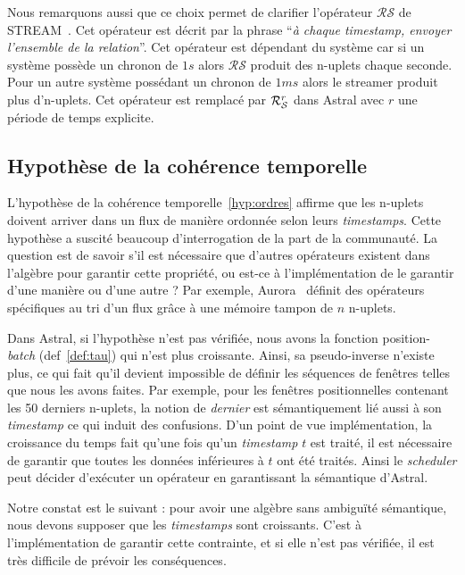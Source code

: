 Nous remarquons aussi que ce choix permet de clarifier l'opérateur $\mathcal{RS}$ de STREAM~\cite{Arasu:stream}. Cet opérateur est décrit par la phrase \enquote{\it à chaque timestamp, envoyer l'ensemble de la relation}. Cet opérateur est dépendant du système car si un système possède un chronon de $1s$ alors $\mathcal{RS}$ produit des n-uplets chaque seconde. Pour un autre système possédant un chronon de $1ms$ alors le streamer produit plus d'n-uplets. Cet opérateur est remplacé par $\mathcal{R}_{\mathcal S}^{r}$ dans Astral avec $r$ une période de temps explicite.

\subsection{Hypothèse de la cohérence temporelle}\label{sec:valid:expressivite:modele:coherence}
L'hypothèse de la cohérence temporelle~\ref{hyp:ordres} affirme que les n-uplets doivent arriver dans un flux de manière ordonnée selon leurs \textit{timestamps}. Cette hypothèse a suscité beaucoup d'interrogation de la part de la communauté. La question est de savoir s'il est nécessaire que d'autres opérateurs existent dans l'algèbre pour garantir cette propriété, ou est-ce à l'implémentation de le garantir d'une manière ou d'une autre ? Par exemple, Aurora~\cite{Abadi:aurora} définit des opérateurs spécifiques au tri d'un flux grâce à une mémoire tampon de $n$ n-uplets.

Dans Astral, si l'hypothèse n'est pas vérifiée, nous avons la fonction position-\textit{batch} (def~\ref{def:tau}) qui n'est plus croissante. Ainsi, sa pseudo-inverse n'existe plus, ce qui fait qu'il devient impossible de définir les séquences de fenêtres telles que nous les avons faites. Par exemple, pour les fenêtres positionnelles contenant les 50 derniers n-uplets, la notion de \textit{dernier} est sémantiquement lié aussi à son \textit{timestamp} ce qui induit des confusions. D'un point de vue implémentation, la croissance du temps fait qu'une fois qu'un \textit{timestamp} $t$ est traité, il est nécessaire de garantir que toutes les données inférieures à $t$ ont été traités. Ainsi le \textit{scheduler} peut décider d'exécuter un opérateur en garantissant la sémantique d'Astral.

Notre constat est le suivant : pour avoir une algèbre sans ambiguïté sémantique, nous devons supposer que les \textit{timestamps} sont croissants. C'est à l'implémentation de garantir cette contrainte, et si elle n'est pas vérifiée, il est très difficile de prévoir les conséquences.

